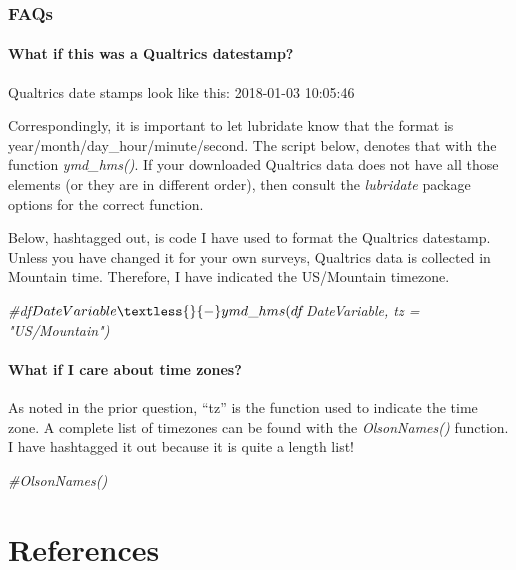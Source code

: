 \documentclass[
  11pt,
]{book}
\newenvironment{Shaded}{\begin{snugshade}}{\end{snugshade}}
\newcommand{\CommentTok}[1]{\textcolor[rgb]{0.56,0.35,0.01}{\textit{#1}}}
\begin{document}
\hypertarget{faqs}{%
\subsection{FAQs}\label{faqs}}

\hypertarget{what-if-this-was-a-qualtrics-datestamp}{%
\subsubsection{What if this was a Qualtrics datestamp?}\label{what-if-this-was-a-qualtrics-datestamp}}

Qualtrics date stamps look like this: 2018-01-03 10:05:46

Correspondingly, it is important to let lubridate know that the format is year/month/day\_hour/minute/second. The script below, denotes that with the function \emph{ymd\_hms()}. If your downloaded Qualtrics data does not have all those elements (or they are in different order), then consult the \emph{lubridate} package options for the correct function.

Below, hashtagged out, is code I have used to format the Qualtrics datestamp. Unless you have changed it for your own surveys, Qualtrics data is collected in Mountain time. Therefore, I have indicated the US/Mountain timezone.

\begin{Shaded}
\begin{Highlighting}[]
\CommentTok{\#df$DateVariable \textless{}{-} ymd\_hms(df$DateVariable, tz = "US/Mountain")}
\end{Highlighting}
\end{Shaded}

\hypertarget{what-if-i-care-about-time-zones}{%
\subsubsection{What if I care about time zones?}\label{what-if-i-care-about-time-zones}}

As noted in the prior question, ``tz'' is the function used to indicate the time zone. A complete list of timezones can be found with the \emph{OlsonNames()} function. I have hashtagged it out because it is quite a length list!

\begin{Shaded}
\begin{Highlighting}[]
\CommentTok{\#OlsonNames()}
\end{Highlighting}
\end{Shaded}

\hypertarget{refs}{%
\chapter*{References}\label{refs}}

  
\end{document}
